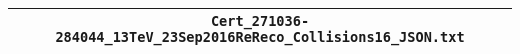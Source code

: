 \begin{tabular}{c}
\hline
\verb!Cert_271036-284044_13TeV_23Sep2016ReReco_Collisions16_JSON.txt!\tabularnewline
\hline
\end{tabular}
